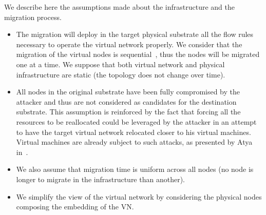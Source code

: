 \label{sec:mdp-system-hypotheses}
We describe here the assumptions made about the infrastructure and the migration process.

\begin{itemize}
    \item
    The migration will deploy in the target physical substrate all the flow rules necessary to operate the virtual network properly. We consider that the migration of the virtual nodes is sequential~\cite{Lime-Ghorbani2014}, thus the nodes will be migrated one at a time.
    We suppose that both virtual network and physical infrastructure are static (\ie the topology does not change over time).
    
    \item All nodes in the original substrate have been fully compromised by the attacker and thus are not considered as candidates for the destination substrate.  
    This assumption is reinforced by the fact that forcing all the resources to be reallocated could be leveraged by the attacker in an attempt to have the target virtual network relocated closer to his virtual machines.
    Virtual machines are already subject to such attacks, as presented by Atya \etal in~\cite{stalling-atya2017,malicious-atya2017}.

    \item
    We also assume that migration time is uniform across all nodes (\ie no node is longer to migrate in the infrastructure than another).
    
    \item
     We simplify the view of the virtual network by considering the physical nodes composing the embedding of the VN.
\end{itemize}

